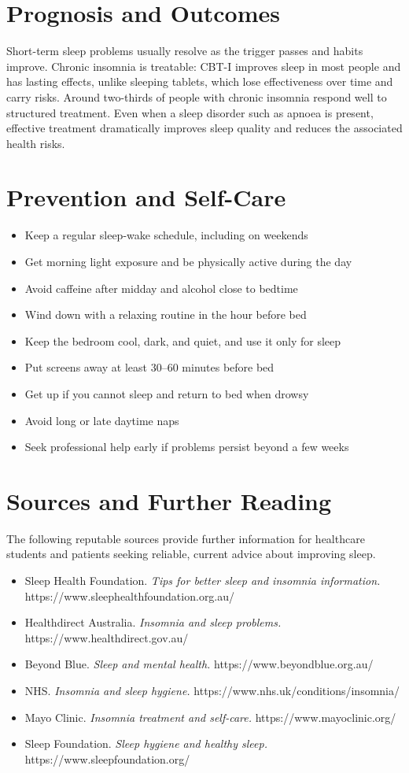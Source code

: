 \section*{Prognosis and Outcomes}
Short-term sleep problems usually resolve as the trigger passes and habits improve. Chronic insomnia is treatable: CBT-I improves sleep in most people and has lasting effects, unlike sleeping tablets, which lose effectiveness over time and carry risks. Around two-thirds of people with chronic insomnia respond well to structured treatment. Even when a sleep disorder such as apnoea is present, effective treatment dramatically improves sleep quality and reduces the associated health risks.

\section*{Prevention and Self-Care}
\begin{itemize}
    \item Keep a regular sleep-wake schedule, including on weekends
    \item Get morning light exposure and be physically active during the day
    \item Avoid caffeine after midday and alcohol close to bedtime
    \item Wind down with a relaxing routine in the hour before bed
    \item Keep the bedroom cool, dark, and quiet, and use it only for sleep
    \item Put screens away at least 30--60 minutes before bed
    \item Get up if you cannot sleep and return to bed when drowsy
    \item Avoid long or late daytime naps
    \item Seek professional help early if problems persist beyond a few weeks
\end{itemize}

\section*{Sources and Further Reading}
The following reputable sources provide further information for healthcare students and patients seeking reliable, current advice about improving sleep.
\begin{itemize}
    \item Sleep Health Foundation. \textit{Tips for better sleep and insomnia information.} https://www.sleephealthfoundation.org.au/
    \item Healthdirect Australia. \textit{Insomnia and sleep problems.} https://www.healthdirect.gov.au/
    \item Beyond Blue. \textit{Sleep and mental health.} https://www.beyondblue.org.au/
    \item NHS. \textit{Insomnia and sleep hygiene.} https://www.nhs.uk/conditions/insomnia/
    \item Mayo Clinic. \textit{Insomnia treatment and self-care.} https://www.mayoclinic.org/
    \item Sleep Foundation. \textit{Sleep hygiene and healthy sleep.} https://www.sleepfoundation.org/
\end{itemize}
